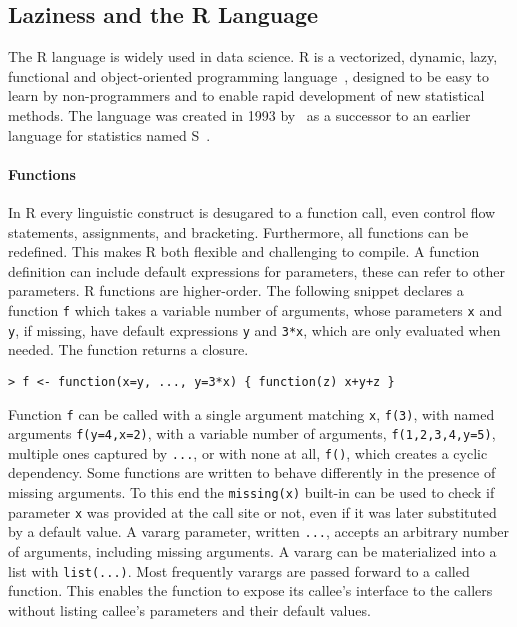 \documentclass[review,nonacm,screen,acmsmall,anonymous=true]{acmart}
\newcommand{\code}[1]{\lstinline |#1|\xspace}
\renewcommand{\c}[1]{\lstinline |#1|\xspace}
\begin{document}
\subsection{Laziness and the R Language}

The R language is widely used in data science. R is a vectorized, dynamic, lazy,
functional and object-oriented programming language~\cite{ecoop12}, designed to
be easy to learn by non-programmers and to enable rapid development of new
statistical methods. The language was created in 1993 by~\citet{R96} as a
successor to an earlier language for statistics named S~\cite{S88}.

\paragraph{Functions}
In R every linguistic construct is desugared to a function call, even control
flow statements, assignments, and bracketing. Furthermore, all functions can be
redefined. This makes R both flexible and challenging to compile. A function
definition can include default expressions for parameters, these can refer to
other parameters. R functions are higher-order. The following snippet declares a
function \code f which takes a variable number of arguments, whose parameters
\code x and \code y, if missing, have default expressions \code y and
\code{3*x}, which are only evaluated when needed. The function returns a closure.
\begin{lstlisting}
> f <- function(x=y, ..., y=3*x) { function(z) x+y+z }
\end{lstlisting}\vspace{1mm}
\noindent
Function \code f can be called with a single argument matching \code x,
\code{f(3)}, with named arguments \code{f(y=4,x=2)}, with a variable number
of arguments, \code{f(1,2,3,4,y=5)}, multiple ones captured by \code{...}, or with none at
all, \code{f()}, which creates a cyclic dependency.
Some functions are written to behave differently in the presence of missing
arguments. To this end the \c{missing(x)} built-in can be used
to check if parameter \code{x} was provided at the call site or not, even if it
was later substituted by a default value.
A vararg parameter, written
\code{...}, accepts an arbitrary number of arguments, including missing arguments.
A vararg can be materialized into a list with \code{list(...)}. Most frequently
varargs are passed forward to a called function. This enables the function to
expose its callee's interface to the callers without listing callee's parameters
and their default values.
\end{document}
